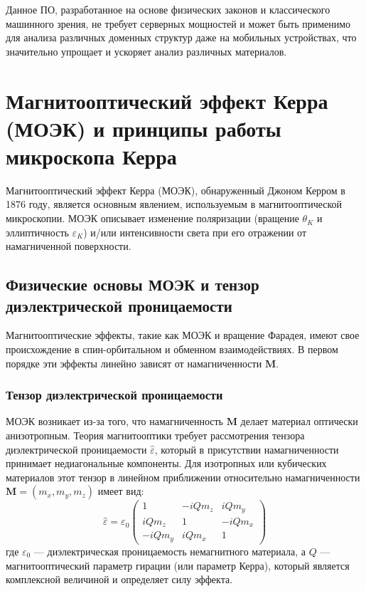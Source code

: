 \documentclass[12pt,a4paper]{article}
\numberwithin{equation}{section}
\begin{document}
Данное ПО, разработанное на основе физических законов и классического машинного зрения, не требует серверных мощностей и может быть применимо для анализа различных доменных структур даже на мобильных устройствах, что значительно упрощает и ускоряет анализ различных материалов. 

\section{Магнитооптический эффект Керра (МОЭК) и принципы работы микроскопа Керра}

Магнитооптический эффект Керра (МОЭК), обнаруженный Джоном Керром в 1876 году, является основным явлением, используемым в магнитооптической микроскопии. МОЭК описывает изменение поляризации (вращение $\theta_K$ и эллиптичность $\varepsilon_K$) и/или интенсивности света при его отражении от намагниченной поверхности.

\subsection{Физические основы МОЭК и тензор диэлектрической проницаемости}

Магнитооптические эффекты, такие как МОЭК и вращение Фарадея, имеют свое происхождение в спин-орбитальном и обменном взаимодействиях. В первом порядке эти эффекты линейно зависят от намагниченности $\mathbf{M}$.

\subsubsection{Тензор диэлектрической проницаемости}
МОЭК возникает из-за того, что намагниченность $\mathbf{M}$ делает материал оптически анизотропным. Теория магнитооптики требует рассмотрения тензора диэлектрической проницаемости $\hat{\varepsilon}$, который в присутствии намагниченности принимает недиагональные компоненты. Для изотропных или кубических материалов этот тензор в линейном приближении относительно намагниченности $\mathbf{M} = (m_x, m_y, m_z)$ имеет вид:
$$
\hat{\varepsilon} = \varepsilon_0 \begin{pmatrix} 1 & -i Q m_z & i Q m_y \\ i Q m_z & 1 & -i Q m_x \\ -i Q m_y & i Q m_x & 1 \end{pmatrix}
$$
где $\varepsilon_0$ --- диэлектрическая проницаемость немагнитного материала, а $Q$ --- магнитооптический параметр гирации (или параметр Керра), который является комплексной величиной и определяет силу эффекта.
\end{document}
